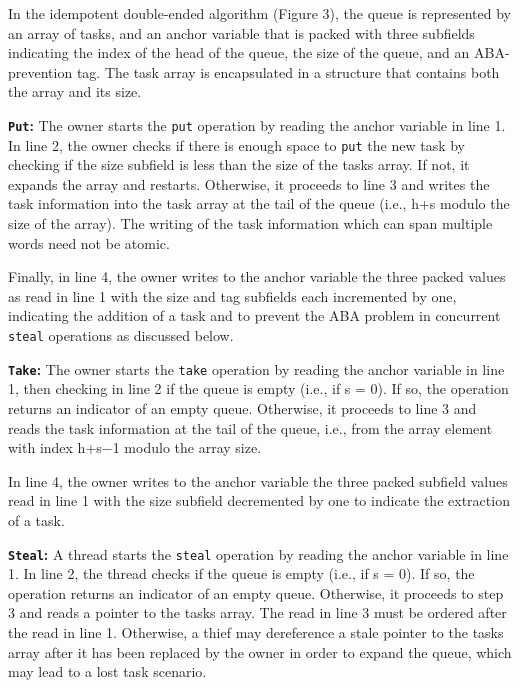 
In the idempotent double-ended algorithm (Figure 3), the queue is
represented by an array of tasks, and an anchor variable that is
packed with three subfields indicating the index of the head of the
queue, the size of the queue, and an ABA-prevention tag. The task
array is encapsulated in a structure that contains both the array and
its size.

\textbf{\lstinline!Put!:} The owner starts the \lstinline!put!
operation by reading the anchor variable in line 1. In line 2, the
owner checks if there is enough space to \lstinline!put! the new task
by checking if the size subfield is less than the size of the tasks
array. If not, it expands the array and restarts. Otherwise, it
proceeds to line 3 and writes the task information into the task array
at the tail of the queue (i.e., h+s modulo the size of the array). The
writing of the task information which can span multiple words need not
be atomic.

Finally, in line 4, the owner writes to the anchor variable the three
packed values as read in line 1 with the size and tag subfields each
incremented by one, indicating the addition of a task and to prevent
the ABA problem in concurrent \lstinline!steal! operations as
discussed below.

\textbf{\lstinline!Take!:} The owner starts the \lstinline!take!
operation by reading the anchor variable in line 1, then checking in
line 2 if the queue is empty (i.e., if s = 0). If so, the operation
returns an indicator of an empty queue. Otherwise, it proceeds to
line 3 and reads the task information at the tail of the queue, i.e.,
from the array element with index h+s−1 modulo the array size.

In line 4, the owner writes to the anchor variable the three packed
subfield values read in line 1 with the size subfield decremented by
one to indicate the extraction of a task.

\textbf{\lstinline!Steal!:} A thread starts the \lstinline!steal!
operation by reading the anchor variable in line 1. In line 2, the
thread checks if the queue is empty (i.e., if s = 0). If so, the
operation returns an indicator of an empty queue. Otherwise, it
proceeds to step 3 and reads a pointer to the tasks array. The read in
line 3 must be ordered after the read in line 1. Otherwise, a thief
may dereference a stale pointer to the tasks array after it has been
replaced by the owner in order to expand the queue, which may lead to
a lost task scenario.

